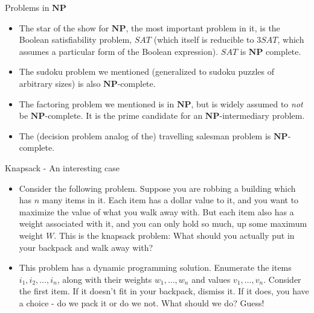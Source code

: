 \documentclass{beamer}
\begin{document}
\begin{frame}{Problems in $\mathbf{NP}$}
    \begin{itemize}
        \item The star of the show for $\mathbf{NP}$, the most important problem in it, is the Boolean satisfiability problem, $SAT$ (which itself is reducible to $3SAT$, which assumes a particular form of the Boolean expression). $SAT$ is $\mathbf{NP}$ complete. 
        \item The sudoku problem we mentioned (generalized to sudoku puzzles of arbitrary sizes) is also $\mathbf{NP}$-complete. 
        \item The factoring problem we mentioned is in $\mathbf{NP}$, but is widely assumed to \emph{not} be $\mathbf{NP}$-complete. It is the prime candidate for an $\mathbf{NP}$-intermediary problem. 
        \item The (decision problem analog of the) travelling salesman problem is $\mathbf{NP}$-complete. 
    \end{itemize}
\end{frame}

\begin{frame}{Knapsack - An interesting case}
    \begin{itemize}
        \item Consider the following problem. Suppose you are robbing a building which has $n$ many items in it. Each item has a dollar value to it, and you want to maximize the value of what you walk away with. But each item also has a weight associated with it, and you can only hold so much, up some maximum weight $W$. This is the knapsack problem: What should you actually put in your backpack and walk away with? \pause 
        \item This problem has a dynamic programming solution. Enumerate the items $i_1,i_2,\ldots,i_n$, along with their weights $w_1,\ldots,w_n$ and values $v_1,\ldots,v_n$. Consider the first item. If it doesn't fit in your backpack, dismiss it. If it does, you have a choice - do we pack it or do we not. What should we do? Guess!
    \end{itemize}
\end{frame}
\end{document}
